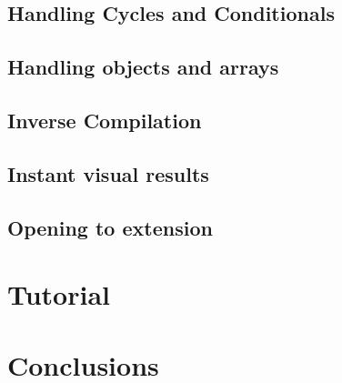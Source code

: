 \subsection{Handling Cycles and Conditionals}

\subsection{Handling objects and arrays}

\subsection{Inverse Compilation}

\subsection{Instant visual results}

\subsection{Opening to extension}

\section{Tutorial}

\section{Conclusions}
